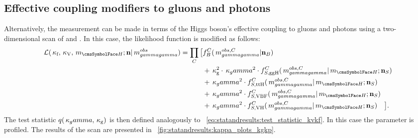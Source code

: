 %

\subsection{Effective coupling modifiers to gluons and photons}
Alternatively, the measurement can be made in terms of the Higgs boson's effective coupling to gluons and photons using a two-dimensional \DNLL scan of \kGlu and \kPho. In this case, the likelihood function is modified as follows:
\begin{equation}
\label{eq:statandresults:likelihood_function_kgkg}
\begin{split}
 \mathcal{L}(\kf,\kV, \mH; \mathbf{n} | \mgg^{obs} ) = \prod_C \big[{}&f^C_B(\mgg^{obs,C} | \mathbf{n}_B ) \\ 
&+ \kGlu^2\cdot \kPho^2 \cdot f^C_{S,{\text{ggH}}}(\mgg^{obs,C} |\mH ; \mathbf{n}_S) \\ 
&+ \kPho^2\cdot f^C_{S,{\text{ttH}}}(\mgg^{obs,C} |\mH ; \mathbf{n}_S) \\ 
&+ \kPho^2\cdot f^C_{S,{\text{VBF}}}(\mgg^{obs,C} |\mH ; \mathbf{n}_S) \\
&+ \kPho^2\cdot f^C_{S,{\text{VH}}}(\mgg^{obs,C} |\mH ; \mathbf{n}_S)\quad\big].
\end{split}
\end{equation}
The test statistic $q(\,\kappa_gamma,\,\kappa_\text{g})$ is then defined analogously to \Eq~\ref{eq:statandresults:test_statistic_kvkf}.
In this case the \mH parameter is profiled. The results of the \DNLL scan are presented in \Fig~\ref{fig:statandresults:kappa_plots_kgkp}.

